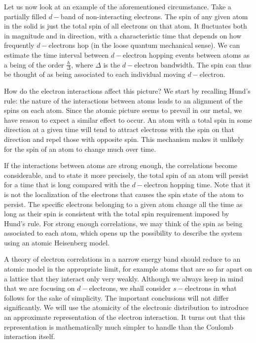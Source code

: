 Let us now look at an example of the aforementioned circumstance. Take a partially filled $d-$band of non-interacting electrons. The spin of any given atom in the solid is just the total spin of all electrons on that atom. It fluctuates both in magnitude and in direction, with a characteristic time that depends on how frequently $d-$electrons hop (in the loose quantum mechanical sense). We can estimate the time interval between $d-$electron hopping events between atoms as a being of the order $\frac{\hbar}{\Delta}$, where $\Delta$ is the $d-$electron bandwidth. The spin can thus be thought of as being associated to each individual moving $d-$electron.

How do the electron interactions affect this picture? We start by recalling Hund's rule: the nature of the  interactions between atoms leads to an alignment of the spins on each atom. Since the atomic picture seems to prevail in our metal, we have reason to expect a similar effect to occur. An atom with a total spin in some direction at a given time will tend to attract electrons with the spin on that direction and repel those with opposite spin. This mechanism makes it unlikely for the spin of an atom to change much over time.

If the interactions between atoms are strong enough, the correlations become considerable, and to state it more precisely, the total spin of an atom will persist for a time that is long compared with the $d-$electron hopping time. Note that it is not the localization of the electrons that causes the spin state of the atom to persist. The specific electrons belonging to a given atom change all the time as long as their spin is consistent with the total spin requirement imposed by Hund's rule. For strong enough correlations, we may think of the spin as being associated to each atom, which opens up the possibility to describe the system using an atomic Heisenberg model.

A theory of electron correlations in a narrow energy band should reduce to an atomic model in the appropriate limit, for example atoms that are so far apart on a lattice that they interact only very weakly. Although we always keep in mind that we are focusing on $d-$electrons, we shall consider $s-$electrons in what follows for the sake of simplicity. The important conclusions will not differ significantly. We will use the atomicity of the electronic distribution to introduce an approximate representation of the electron interaction. It turns out that this representation is mathematically much simpler to handle than the Coulomb interaction itself.

